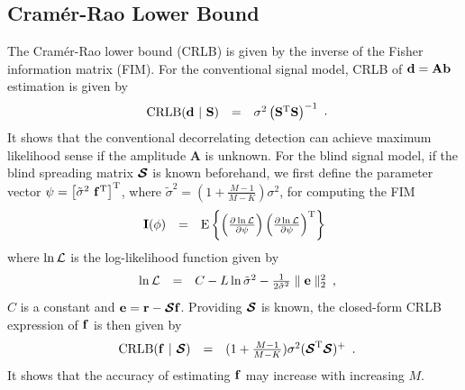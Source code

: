 \documentclass[a4paper,10pt,fleqn, twocolumn]{IEEETran}
\newcommand{\br}{{\mathbf r}}
\newcommand{\bA}{{\mathbf A}}
\newcommand{\bb}{{\bf b}}
\newcommand{\bd}{{\bf d}}
\newcommand{\bbf}{{\bf f}}
\newcommand{\bS}{{\bf S}}
\newcommand{\bI}{{\bf I}}
\newcommand{\bcS}{{\mbox {\boldmath ${\cal S}$}}}
\begin{document}
\subsection{Cram\'{e}r-Rao Lower Bound} The Cram\'{e}r-Rao lower
bound (CRLB) is given by the inverse of the Fisher information
matrix (FIM). For the conventional signal model, CRLB of
$\bd=\bA\bb$ estimation is given by
\begin{equation}
\begin{array}{rcl}
{\rm CRLB}(\bd\ |\ \bS)&=&\sigma^{2}\left(\bS^{\rm
T}\bS\right)^{\rm -1}
\end{array}.\label{CRLB_b}
\end{equation}
\noindent It shows that the conventional decorrelating detection
can achieve maximum likelihood sense if the amplitude $\bA$ is
unknown. For the blind signal model, if the blind spreading matrix
$\bcS$ is known beforehand, we first define the parameter vector
$\mathbf{\psi} = \left[\tilde{\sigma}^{2}\ \bbf^{\rm
T}\right]^{\rm T}$, where $\tilde{\sigma}^{2}
=(1+\frac{M-1}{M-K})\sigma^{2}$, for computing the FIM
\begin{equation}
\begin{array}{rcl}
{\bI(\mathbf{\phi})} &=& {\rm E} \left\{ \left( \frac{\partial
\ln{\cal L}}{\partial \mathbf{\psi}} \right) \left( \frac{\partial
\ln{\cal L}}{\partial \mathbf{\psi}} \right)^{\rm T} \right\}
\label{fim}
\end{array}
\end{equation}
\noindent where $\ln{\cal L}$ is the log-likelihood function given
by
\begin{equation}
\begin{array}{rcl}
\ln{\cal
L}&=&C-L\ln\tilde{\sigma}^2-\frac{1}{2\tilde{\sigma}^2}\parallel\mathbf{e}\parallel_2^2
\end{array},\label{logl}
\end{equation}
\noindent $C$ is a constant and $\mathbf{e}=\br-\bcS\bbf$.
Providing $\bcS$ is known, the closed-form CRLB expression of
$\bbf$ is then given by
\begin{equation}
\begin{array}{rcl}
{\rm CRLB}(\bbf\ |\
\bcS)&=&(1+\frac{M-1}{M-K})\sigma^{2}(\bcS^{\rm T}\bcS)^{\rm +}
\end{array}.\label{CRLB_f}
\end{equation}
\noindent It shows that the accuracy of estimating $\bbf$ may
increase with increasing $M$.
\end{document}
